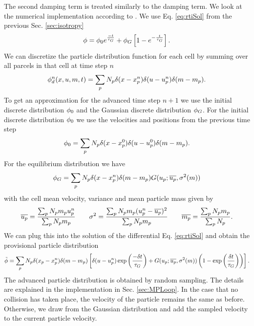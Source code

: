 The second damping term is treated similarly to the damping term.
We look at the numerical implementation according to \cite{isotropy}.
We use Eq. \eqref{eq:rtiSol} from the previous Sec. \ref{sec:isotropy}
\begin{equation}
\phi= \phi_0 e^{\frac{-t}{\tau_G}} + \phi_G \left[ 1 - e^{- \frac{t}{\tau_G}} \right].
\end{equation}
We can discretize the particle distribution function for each cell by summing over all parcels in that cell at time step $n$
\begin{equation}
    \phi_d^n (x, u , m, t) = \sum_p N_p \delta ( x - x_p^n) \delta ( u - u_p^n) \delta (m - m_p).
\end{equation}
To get an approximation for the advanced time step $n+1$ we use the initial discrete distribution $\phi_0$ and the Gaussian discrete distribution $\phi_G$.
For the initial discrete distribution $\phi_0$ we use the velocities and positions from the previous time step
\begin{equation}
    \phi_0 = \sum_p N_p \delta ( x - x_p^0) \delta ( u - u_p^0) \delta (m - m_p).
\end{equation}
For the equilibrium distribution we have 
\begin{equation}
    \phi_G = \sum_p N_p \delta (x - x_p^n) \delta(m - m_p) G(u_p;\overline{u_p}, \sigma^2(m))
\end{equation}
with the cell mean velocity, variance and mean particle mass given by
\begin{equation}
    \overline{u_p} = \dfrac{\sum_p N_p m_p u_p^n}{\sum_p N_p m_p} \qquad \sigma^2 = \dfrac{\sum_p N_p m_p (u_p^n - \overline{u_p})^2}{\sum_p N_p m_p} \qquad \overline{m_p} = \dfrac{\sum_p N_p m_p}{\sum_p N_p}.
\end{equation}
We can plug this into the solution of the differential Eq. \eqref{eq:rtiSol} and obtain the provisional particle distribution 
\begin{equation}
    \tilde{\phi} = \sum_p N_p \delta (x_p - x_p^n) \delta (m - m_p) \left[ \delta (u - u_p^n) \operatorname{exp}\left(\dfrac{-\delta t}{\tau_G} \right) +  G(u_p;\overline{u_p}, \sigma^2(m)) \left( 1 - \operatorname{exp}\left( \dfrac{\delta t}{\tau_G} \right) \right)\right].
\end{equation}
The advanced particle distribution is obtained by random sampling. The details are explained in the implementation in Sec. \ref{sec:MPLoop}.
In the case that no collision has taken place, the velocity of the particle remains the same as before. Otherwise, we draw from the Gaussian distribution and add the sampled velocity to the current particle velocity.
